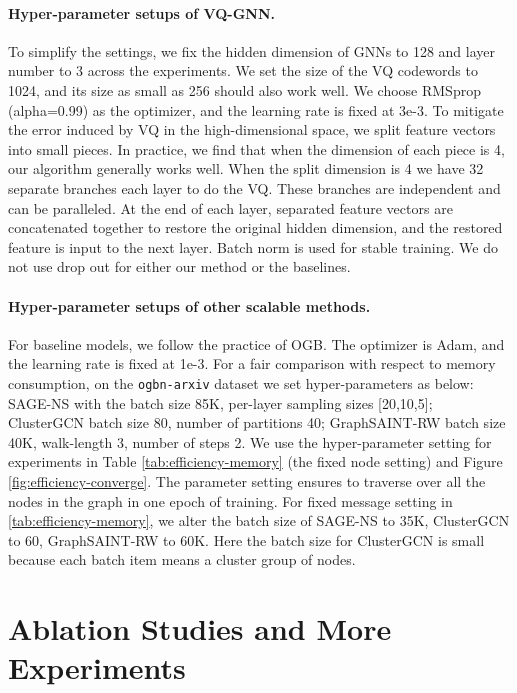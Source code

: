 \documentclass{article}
\newcommand{\cm}{\paragraph}
\begin{document}
\cm{Hyper-parameter setups of VQ-GNN.} To simplify the settings, we fix the hidden dimension of GNNs to 128 and layer number to 3 across the experiments. We set the size of the VQ codewords to 1024, and its size as small as 256 should also work well. We choose RMSprop (alpha=0.99) as the optimizer, and the learning rate is fixed at 3e-3. To mitigate the error induced by VQ in the high-dimensional space, we split feature vectors into small pieces. In practice, we find that when the dimension of each piece is 4, our algorithm generally works well. When the split dimension is 4 we have 32 separate branches each layer to do the VQ. These branches are independent and can be paralleled. At the end of each layer, separated feature vectors are concatenated together to restore the original hidden dimension, and the restored feature is input to the next layer. Batch norm is used for stable training. We do not use drop out for either our method or the baselines.

\cm{Hyper-parameter setups of other scalable methods.} For baseline models, we follow the practice of OGB. The optimizer is Adam, and the learning rate is fixed at 1e-3. For a fair comparison with respect to memory consumption, on the \texttt{ogbn-arxiv} dataset we set hyper-parameters as below: SAGE-NS with the batch size 85K, per-layer sampling sizes [20,10,5]; ClusterGCN batch size 80, number of partitions 40; GraphSAINT-RW batch size 40K, walk-length 3, number of steps 2. We use the hyper-parameter setting for experiments in Table \ref{tab:efficiency-memory} (the fixed node setting) and Figure \ref{fig:efficiency-converge}. The parameter setting ensures to traverse over all the nodes in the graph in one epoch of training. For fixed message setting in \ref{tab:efficiency-memory}, we alter the batch size of SAGE-NS to 35K, ClusterGCN to 60, GraphSAINT-RW to 60K. Here the batch size for ClusterGCN is small because each batch item means a cluster group of nodes.



\section{Ablation Studies and More Experiments}
\label{apd:more-experiments}
\end{document}

